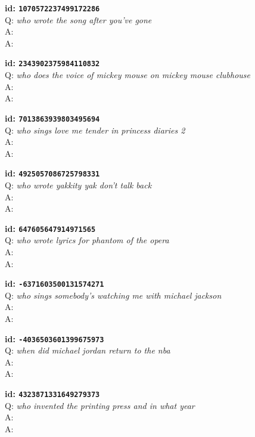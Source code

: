 \tiny{\setlength{\parindent}{0cm}
\textbf{id: \texttt{1070572237499172286}} \\
Q: \textit{who wrote the song after you've gone} \\
A:  \\
A: }

\tiny{\setlength{\parindent}{0cm}
\textbf{id: \texttt{2343902375984110832}} \\
Q: \textit{who does the voice of mickey mouse on mickey mouse clubhouse} \\
A:  \\
A: }

\tiny{\setlength{\parindent}{0cm}
\textbf{id: \texttt{7013863939803495694}} \\
Q: \textit{who sings love me tender in princess diaries 2} \\
A:  \\
A: }

\tiny{\setlength{\parindent}{0cm}
\textbf{id: \texttt{4925057086725798331}} \\
Q: \textit{who wrote yakkity yak don't talk back} \\
A:  \\
A: }

\tiny{\setlength{\parindent}{0cm}
\textbf{id: \texttt{647605647914971565}} \\
Q: \textit{who wrote lyrics for phantom of the opera} \\
A:  \\
A: }

\tiny{\setlength{\parindent}{0cm}
\textbf{id: \texttt{-6371603500131574271}} \\
Q: \textit{who sings somebody's watching me with michael jackson} \\
A:  \\
A: }

\tiny{\setlength{\parindent}{0cm}
\textbf{id: \texttt{-4036503601399675973}} \\
Q: \textit{when did michael jordan return to the nba} \\
A:  \\
A: }

\tiny{\setlength{\parindent}{0cm}
\textbf{id: \texttt{4323871331649279373}} \\
Q: \textit{who invented the printing press and in what year} \\
A:  \\
A: }


